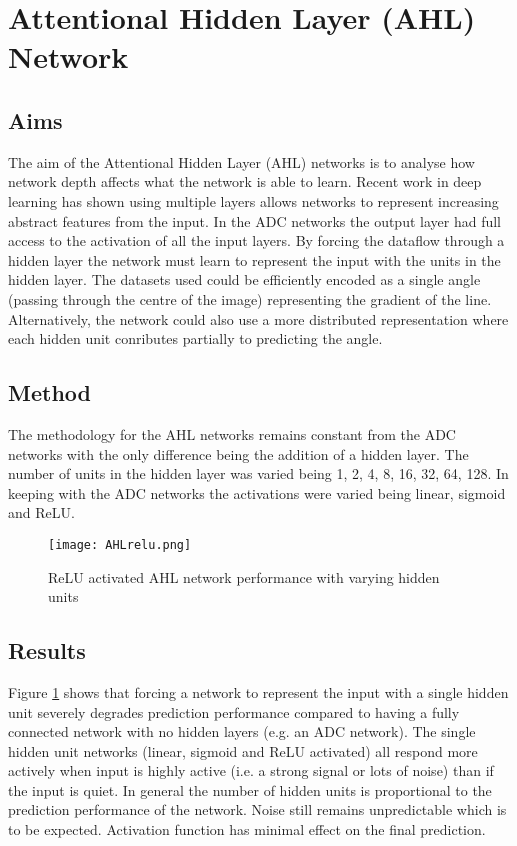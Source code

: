 \section{Attentional Hidden Layer (AHL) Network}

\subsection{Aims}
The aim of the Attentional Hidden Layer (AHL) networks is to analyse how network depth affects what the network is able to learn. 
Recent work in deep learning\cite{krizhevsky2012imagenet} has shown using multiple layers allows networks to represent increasing abstract features from the input. 
In the ADC networks the output layer had full access to the activation of all the input layers. 
By forcing the dataflow through a hidden layer the network must learn to represent the input with the units in the hidden layer.  
The datasets used could be efficiently encoded as a single angle (passing through the centre of the image) representing the gradient of the line.
Alternatively, the network could also use a more distributed representation where each hidden unit conributes partially to predicting the angle. 


\subsection{Method}
The methodology for the AHL networks remains constant from the ADC networks with the only difference being the addition of a hidden layer.
The number of units in the hidden layer was varied being 1, 2, 4, 8, 16, 32, 64, 128.
In keeping with the ADC networks the activations were varied being linear, sigmoid and ReLU. 


\begin{figure}[h]
    \centering
    \texttt{[image: AHLrelu.png]}
    \caption{ReLU activated AHL network performance with varying hidden units}
    \label{fig:AHLrelu}
\end{figure}

\subsection{Results}
Figure \ref{fig:AHLrelu} shows that forcing a network to represent the input with a single hidden unit severely degrades prediction performance compared to having a fully connected network with no hidden layers (e.g. an ADC network). 
The single hidden unit networks (linear, sigmoid and ReLU activated) all respond more actively when input is highly active (i.e. a strong signal or lots of noise) than if the input is quiet. 
In general the number of hidden units is proportional to the prediction performance of the network.
Noise still remains unpredictable which is to be expected. 
Activation function has minimal effect on the final prediction. 


